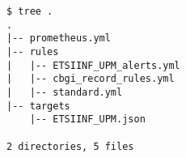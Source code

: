 
\begin{verbatim}
$ tree .
.
|-- prometheus.yml
|-- rules
|   |-- ETSIINF_UPM_alerts.yml
|   |-- cbgi_record_rules.yml
|   |-- standard.yml
|-- targets
    |-- ETSIINF_UPM.json

2 directories, 5 files
\end{verbatim}